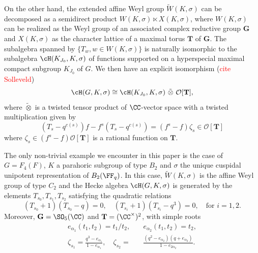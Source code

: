 On the other hand, the extended affine Weyl group $\tilde{W}(K,\sigma)$ can be decomposed as a semidirect product $W(K,\sigma)\ltimes X(K,\sigma)$, where $W(K,\sigma)$ can be realized as the Weyl group of an associated complex reductive group $\mathbf{G}$ and $X(K,\sigma)$ as the character lattice of a maximal torus $\mathbf{T}$ of $\mathbf{G}$. The subalgebra spanned by $\{T_w, w\in W(K,\sigma)\}$ is naturally isomorphic to the subalgebra $\cH(K_{J_0},K,\sigma)$ of functions supported on a hyperspecial maximal compact subgroup $K_{J_0}$ of $G$. We then have an explicit isomorphism (\textcolor{red}{cite Solleveld})
\begin{equation}
    \cH(G,K,\sigma)\cong\cH(K_{J_0},K,\sigma)\ \tilde\otimes\ \mathcal{O}[\mathbf{T}],
\end{equation}
where $\tilde\otimes$ is a twisted tensor product of $\CC$-vector space with a twisted multiplication given by 
$$(T_s-q^{c(s)})f-f^{s}(T_s-q^{c(s)})=(f^s-f)\zeta_s\in\mathcal{O}[\mathbf{T}]$$
where $\zeta_s\in(f^s-f)\mathcal{O}[\mathbf{T}]$ is a rational function on $\mathbf{T}$. 
\begin{example}\label{ex:F4_B2_algebra}
    The only non-trivial example we encounter in this paper is the case of $G=F_4(F)$, $K$ a parahoric subgroup of type $B_2$ and $\sigma$ the unique cuspidal unipotent representation of $B_2(\FF_q)$. In this case, $\tilde{W}(K,\sigma)$ is the affine Weyl group of type $C_2$ and the Hecke algebra $\cH(G,K,\sigma)$ is generated by the elements $T_{s_0}, T_{s_1}, T_{s_2}$ satisfying the quadratic relations
    $$(T_{s_0}+1)(T_{s_0}-q)=0,\quad (T_{s_i}+1)(T_{s_i}-q^{3})=0,\quad\text{for }i=1,2.$$
    Moreover, $\mathbf{G}=\SO_5(\CC)$ and $\mathbf{T}=(\CC^\times)^2$, with simple roots 
    \begin{align*}
        e_{\alpha_1}(t_1,t_2)=t_1/t_2,\quad &e_{\alpha_2}(t_1,t_2)=t_2,\\
        \zeta_{s_1}=\frac{q^3-e_{\alpha_1}}{1-e_{\alpha_1}},\quad \zeta_{s_2}=&\frac{(q^2-e_{\alpha_2})(q+e_{\alpha_2})}{1-e_{2\alpha_2}}.
    \end{align*}
\end{example}

